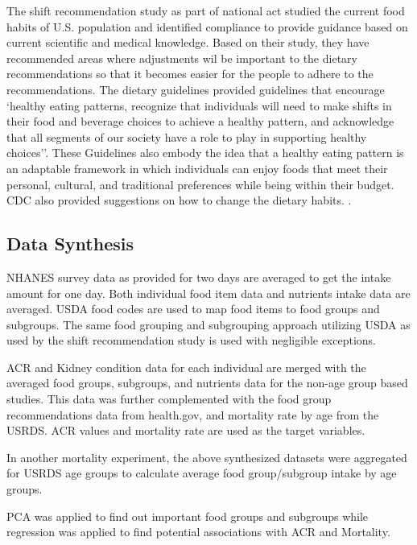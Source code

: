 The shift recommendation study \cite{Health2015}  as part of national act studied the current food habits of U.S. population and identified compliance to provide guidance based on current scientific and medical knowledge. Based on their study, they have recommended areas where adjustments wil be important to the dietary recommendations so that it becomes easier for the people to adhere to the recommendations.  The dietary guidelines provided guidelines that encourage `healthy eating patterns, recognize that individuals will need to make shifts in their food and beverage choices to achieve a healthy pattern, and acknowledge that all segments of our society have a role to play in supporting healthy choices''. These Guidelines also embody the idea that a healthy eating pattern is an adaptable framework in which individuals can enjoy foods that meet their personal, cultural, and traditional preferences while being within their budget. CDC also provided suggestions on how to change the dietary habits. \cite{Health2015}.

\subsection*{Data Synthesis}
NHANES survey data as provided for two days are averaged to get the intake amount for one day. Both individual food item data and nutrients intake data are averaged. USDA food codes are used to map food items to food groups and subgroups. The same food grouping and subgrouping approach utilizing USDA as used by the shift recommendation study is used with negligible exceptions.

ACR and Kidney condition data for each individual are merged with the averaged food groups, subgroups, and nutrients data for the non-age group based studies. This data was further complemented with the food group recommendations data from health.gov, and mortality rate by age from the USRDS. ACR values and mortality rate  are used as the target variables.

In another mortality experiment, the above synthesized datasets were aggregated for USRDS age  groups to calculate average food group/subgroup intake by age groups. 

PCA was applied to find out important food groups and subgroups while regression was applied to find potential associations with ACR and Mortality. 